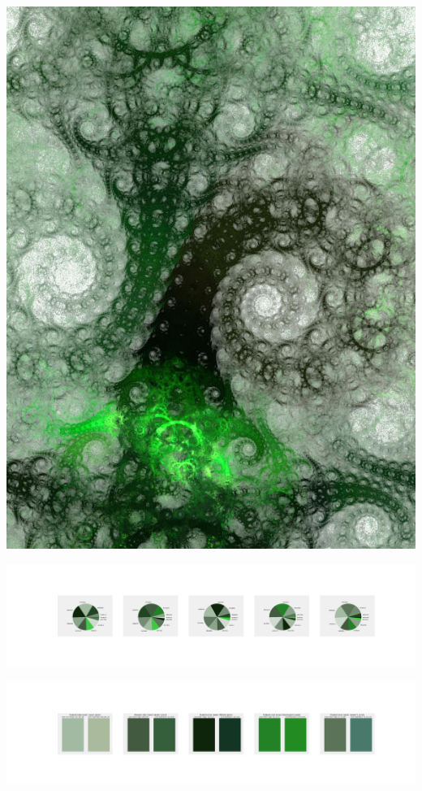 \documentclass[11pt]{article}
\begin{document}
\begin{landscape}
    \begin{center}
    \includegraphics[width=\textwidth]{./nbimg/file (26).jpg}
    \end{center}

    \begin{center}
    \includegraphics[width=250mm]{./nbimg/pie-178.jpg}
    \end{center}

    \begin{center}
    \includegraphics[width=250mm]{./nbimg/peak-178.jpg}
    \end{center}
    


\end{landscape}
\end{document}
